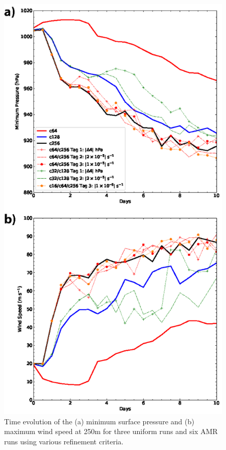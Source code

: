 \begin{figure}
    \centerline{%
    \noindent
    \includegraphics[height=.9\textheight]{Chap3/TC_amr_plots-01.eps}}
    \caption{Time evolution of the (a) minimum surface pressure and (b) maximum
    wind speed at 250m for three uniform runs and six AMR runs
    using various refinement criteria.
}%
    \label{fig:timeevolplots}
\end{figure}

